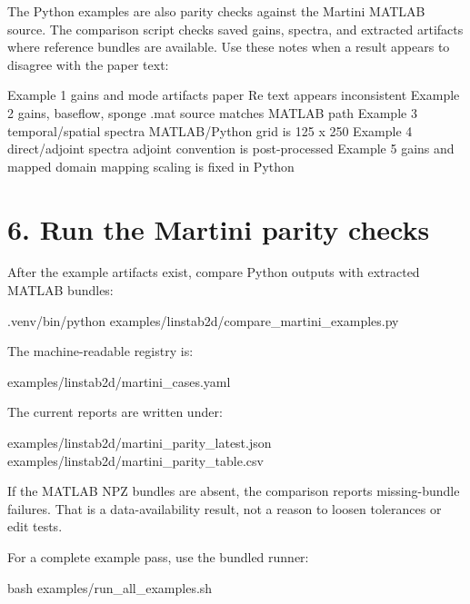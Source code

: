 \documentclass[11pt,a4paper]{article}
\begin{document}
The Python examples are also parity checks against the Martini MATLAB source. The comparison script checks saved gains, spectra, and extracted artifacts where reference bundles are available. Use these notes when a result appears to disagree with the paper text:

\begin{outputbox}
Example 1  gains and mode artifacts   paper Re text appears inconsistent
Example 2  gains, baseflow, sponge    .mat source matches MATLAB path
Example 3  temporal/spatial spectra   MATLAB/Python grid is 125 x 250
Example 4  direct/adjoint spectra     adjoint convention is post-processed
Example 5  gains and mapped domain    mapping scaling is fixed in Python
\end{outputbox}

\section*{6. Run the Martini parity checks}

After the example artifacts exist, compare Python outputs with extracted MATLAB bundles:

\begin{commandbox}
.venv/bin/python examples/linstab2d/compare_martini_examples.py
\end{commandbox}

The machine-readable registry is:

\begin{outputbox}
examples/linstab2d/martini_cases.yaml
\end{outputbox}

The current reports are written under:

\begin{outputbox}
examples/linstab2d/martini_parity_latest.json
examples/linstab2d/martini_parity_table.csv
\end{outputbox}

\begin{warningbox}
If the MATLAB NPZ bundles are absent, the comparison reports missing-bundle failures. That is a data-availability result, not a reason to loosen tolerances or edit tests.
\end{warningbox}

For a complete example pass, use the bundled runner:

\begin{commandbox}
bash examples/run_all_examples.sh
\end{commandbox}
\end{document}
